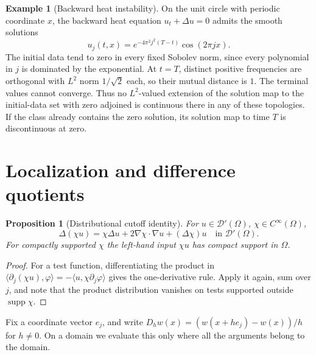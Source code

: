 \documentclass[11pt,oneside,openany]{book}
\DeclareMathOperator{\supp}{supp}
\theoremstyle{plain}
\newtheorem{proposition}[theorem]{Proposition}
\theoremstyle{definition}
\newtheorem{example}[theorem]{Example}
\theoremstyle{remark}
\begin{document}
\begin{example}[Backward heat instability]
On the unit circle with periodic coordinate \(x\), the backward
heat equation \(u_t+\Delta u=0\) admits the smooth solutions
\[
 u_j(t,x)=e^{-4\pi^2j^2(T-t)}\cos(2\pi jx).
\]
The initial data tend to zero in every fixed Sobolev norm,
since every polynomial in \(j\) is dominated by the exponential.
At \(t=T\), distinct positive frequencies are orthogonal with \(L^2\)
norm \(1/\sqrt2\) each, so their mutual distance is \(1\). The terminal
values cannot converge. Thus no \(L^2\)-valued extension of the solution
map to the initial-data set with zero adjoined is continuous there in any
of these topologies. If the class already contains the zero solution,
its solution map to time \(T\) is discontinuous at zero.
\end{example}

\section{Localization and difference quotients}
\label{pde:C04}

\begin{proposition}[Distributional cutoff identity]
\label{prop:pde-cutoff}
For \(u\in\mathcal D'(\Omega)\), \(\chi\in C^\infty(\Omega)\),
\[
 \Delta(\chi u)=\chi\Delta u+2\nabla\chi\cdot\nabla u+(\Delta\chi)u
 \quad\text{in }\mathcal D'(\Omega).
\]
For compactly supported \(\chi\) the left-hand input \(\chi u\)
has compact support in \(\Omega\).
\end{proposition}
\begin{proof}
For a test function, differentiating the product in
\(\langle\partial_j(\chi u),\varphi\rangle
=-\langle u,\chi\partial_j\varphi\rangle\)
gives the one-derivative rule. Apply it again, sum over \(j\),
and note that the product distribution vanishes on tests supported
outside \(\supp\chi\).
\end{proof}

Fix a coordinate vector \(e_j\), and write
\(D_h w(x)=(w(x+h e_j)-w(x))/h\) for \(h\ne0\).
On a domain we evaluate this only where all the arguments belong
to the domain.
\end{document}
